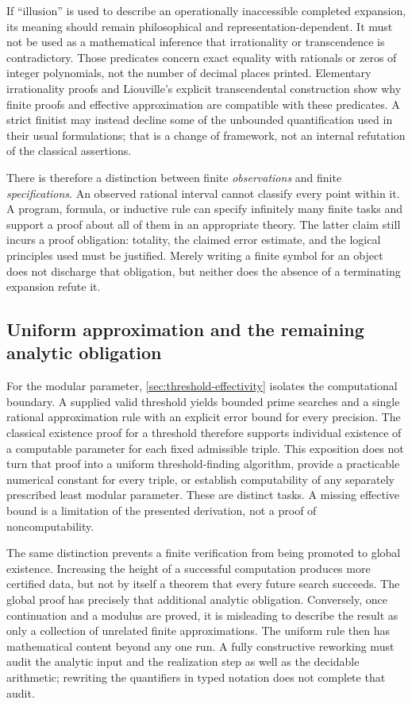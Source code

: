 \documentclass[11pt,reqno]{amsart}
\theoremstyle{blueplain}
\newcounter{type}
\newcounter{asser}
\numberwithin{equation}{section}
\begin{document}
If ``illusion'' is used to describe an operationally inaccessible
completed expansion, its meaning should remain philosophical and
representation-dependent. It must not be used as a mathematical inference
that irrationality or transcendence is contradictory. Those predicates
concern exact equality with rationals or zeros of integer polynomials,
not the number of decimal places printed. Elementary irrationality proofs
and Liouville's explicit transcendental construction show why finite
proofs and effective approximation are compatible with these predicates.
A strict finitist may instead decline some of the unbounded
quantification used in their usual formulations; that is a change of
framework, not an internal refutation of the classical assertions.

There is therefore a distinction between finite \emph{observations} and
finite \emph{specifications}. An observed rational interval cannot
classify every point within it. A program, formula, or inductive rule can
specify infinitely many finite tasks and support a proof about all of
them in an appropriate theory. The latter claim still incurs a proof
obligation: totality, the claimed error estimate, and the logical
principles used must be justified. Merely writing a finite symbol for an
object does not discharge that obligation, but neither does the absence
of a terminating expansion refute it.

\subsection{Uniform approximation and the remaining analytic obligation}\label{sec:conclusion-effectivity}
For the modular parameter, \cref{sec:threshold-effectivity} isolates the
computational boundary. A supplied valid threshold yields bounded prime
searches and a single rational approximation rule with an explicit error
bound for every precision. The classical existence proof for a threshold
therefore supports individual existence of a computable parameter for
each fixed admissible triple. This exposition does not turn that proof
into a uniform threshold-finding algorithm, provide a practicable
numerical constant for every triple, or establish computability of any
separately prescribed least modular parameter. These are distinct tasks.
A missing effective bound is a limitation of the presented derivation,
not a proof of noncomputability.

The same distinction prevents a finite verification from being promoted
to global existence. Increasing the height of a successful computation
produces more certified data, but not by itself a theorem that every
future search succeeds. The global proof has precisely that additional
analytic obligation. Conversely, once continuation and a modulus are
proved, it is misleading to describe the result as only a collection of
unrelated finite approximations. The uniform rule then has mathematical
content beyond any one run. A fully constructive reworking must audit the
analytic input and the realization step as well as the decidable
arithmetic; rewriting the quantifiers in typed notation does not complete
that audit.
\end{document}
